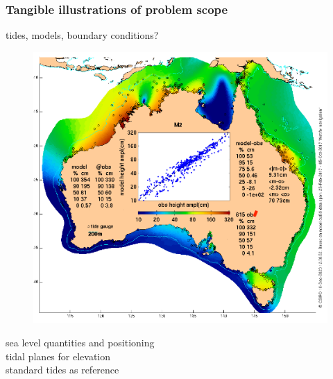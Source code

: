 \begin{frame}
\frametitle{Tangible illustrations of problem scope}

\begin{minipage}{0.6\textwidth} 
\centering
      tides, models, boundary conditions?\\
      \begin{figure}
          \centering
          \includegraphics[height=0.3\textheight]{figures/maps/csiro_compas_map.png}
      \end{figure}
      sea level quantities and positioning\\
      
      tidal planes for elevation\\
      
      standard tides as reference\\
      

\end{minipage}
\end{frame}
